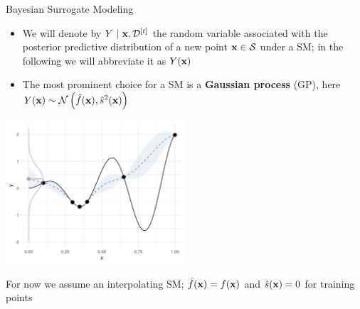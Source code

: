 \documentclass[11pt,compress,t,notes=noshow, xcolor=table]{beamer}
\begin{document}
\begin{vbframe}{Bayesian Surrogate Modeling}
\framebreak

\begin{itemize}
\item We will denote by $Y~|~\mathbf{x}, \mathcal{D}^{[t]}$ the random variable associated with the posterior predictive distribution of a new point $\mathbf{x} \in \mathcal{S}$ under a SM; in the following we will abbreviate it as $Y(\mathbf{x})$
\item The most prominent choice for a SM is a \textbf{Gaussian process} (GP), here $Y(\mathbf{x}) \sim \mathcal{N}\left(\hat{f}(\mathbf{x}), \hat{s}^2(\mathbf{x})\right)$
\end{itemize}
\vspace{-1em}
\begin{center}
  \includegraphics[width = 0.5\textwidth]{figure_man/bayesian_loop_sm_normal.png}
\end{center}
\begin{footnotesize}
    For now we assume an interpolating SM; $\hat{f}(\mathbf{x}) = f(\mathbf{x})$ and $\hat{s}(\mathbf{x}) = 0$ for training points\\
\end{footnotesize}

\end{vbframe} 
\end{document}
